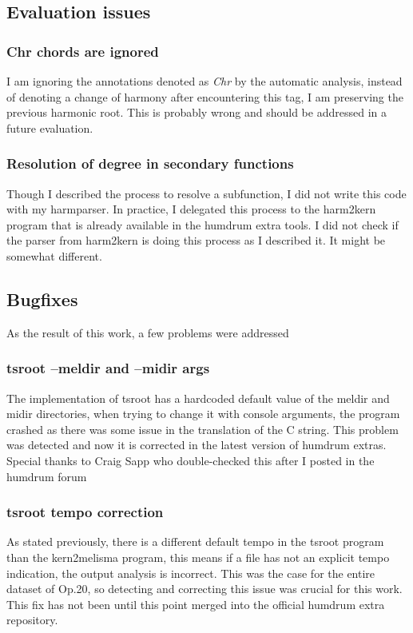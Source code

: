 	\subsection{Evaluation issues}
		\subsubsection{Chr chords are ignored}
    I am ignoring the annotations denoted as \emph{Chr} by the automatic analysis, instead of denoting a change of harmony after encountering this tag, I am preserving the previous harmonic root. This is probably wrong and should be addressed in a future evaluation.
		\subsubsection{Resolution of degree in secondary functions}
    Though I described the process to resolve a subfunction, I did not write this code with my harmparser. In practice, I delegated this process to the harm2kern program that is already available in the humdrum extra tools. I did not check if the parser from harm2kern is doing this process as I described it. It might be somewhat different.
	\subsection{Bugfixes}
  As the result of this work, a few problems were addressed
		\subsubsection{tsroot --meldir and --midir args}
    The implementation of tsroot has a hardcoded default value of the meldir and midir directories, when trying to change it with console arguments, the program crashed as there was some issue in the translation of the C string. This problem was detected and now it is corrected in the latest version of humdrum extras. Special thanks to Craig Sapp who double-checked this after I posted in the humdrum forum
		\subsubsection{tsroot tempo correction}
    As stated previously, there is a different default tempo in the tsroot program than the kern2melisma program, this means if a file has not an explicit tempo indication, the output analysis is incorrect. This was the case for the entire dataset of Op.20, so detecting and correcting this issue was crucial for this work. This fix has not been until this point merged into the official humdrum extra repository.
\newpage
